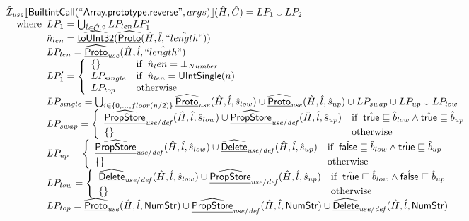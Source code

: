 \[\begin{array}{l}
\hat{\mathcal{I}}_{\it use}\llbracket \mbox{\textsf{BuiltintCall}}(``\mbox{\textsf{Array.prototype.reverse}}",args)\rrbracket(\hat{H},\hat{C}) = LP_1 \cup LP_2\\
\quad{\rm where}\begin{array}[t]{l}
  LP_1 = \bigcup_{\hat{l} \in \hat{C}.2} LP_{len} LP_1'\\
  \hat{n}_{len} = \widehat{\underline{\sf toUInt32}}(\widehat{\underline{\sf Proto}}(\hat{H}, \hat{l}, \hat{``length"}))\\    
  LP_{len} = \widehat{\underline{\sf Proto}}_{\it use}(\hat{H}, \hat{l}, \hat{``length"})\\
  LP_1' = \left\{\begin{array}{ll}
      \left\{\begin{array}{l}\end{array}\right\} & {\rm if}\begin{array}[t]{l}\hat{n}_len = \bot_{Number}\end{array}\\
      LP_{single} & {\rm if}\begin{array}[t]{l}\hat{n}_{len} = \mbox{\textsf{UIntSingle}}(n)\end{array}\\
      LP_{top} & {\rm otherwise}
    \end{array}\right.\\
  LP_{single} = \bigcup_{i \in \{0, ..., floor(n/2)\} } 
    \widehat{\underline{\sf Proto}}_{\it use}(\hat{H}, \hat{l}, \hat{s}_{low}) \cup \widehat{\underline{\sf Proto}}_{\it use}(\hat{H}, \hat{l}, \hat{s}_{up}) \cup LP_{swap} \cup LP_{up} \cup LP_{low}\\
  LP_{swap} = \left\{\begin{array}{ll}
      \widehat{\underline{\sf PropStore}}_{\it use/def}(\hat{H}, \hat{l}, \hat{s}_{low}) \cup \widehat{\underline{\sf PropStore}}_{\it use/def}(\hat{H}, \hat{l}, \hat{s}_{up}) 
      & {\rm if}\begin{array}[t]{l}\hat{\mbox{\textsf{true}}} \sqsubseteq \hat{b}_{low} \land \hat{\mbox{\textsf{true}}} \sqsubseteq \hat{b}_{up} \end{array}\\
      \left\{\begin{array}{l}\end{array}\right\} & {\rm otherwise}
    \end{array}\right.\\
   LP_{up} = \left\{\begin{array}{ll}
      \widehat{\underline{\sf PropStore}}_{\it use/def}(\hat{H}, \hat{l}, \hat{s}_{low}) \cup \widehat{\underline{\sf Delete}}_{\it use/def}(\hat{H}, \hat{l}, \hat{s}_{up}) 
      & {\rm if}\begin{array}[t]{l}\hat{\mbox{\textsf{false}}} \sqsubseteq \hat{b}_{low} \land \hat{\mbox{\textsf{true}}} \sqsubseteq \hat{b}_{up} \end{array}\\
      \left\{\begin{array}{l}\end{array}\right\} & {\rm otherwise}
    \end{array}\right.\\
  LP_{low} = \left\{\begin{array}{ll}
      \widehat{\underline{\sf Delete}}_{\it use/def}(\hat{H}, \hat{l}, \hat{s}_{low}) \cup \widehat{\underline{\sf PropStore}}_{\it use/def}(\hat{H}, \hat{l}, \hat{s}_{up}) 
      & {\rm if}\begin{array}[t]{l}\hat{\mbox{\textsf{true}}} \sqsubseteq \hat{b}_{low} \land \hat{\mbox{\textsf{false}}} \sqsubseteq \hat{b}_{up} \end{array}\\
      \left\{\begin{array}{l}\end{array}\right\} & {\rm otherwise}
    \end{array}\right.\\
  LP_{top} = \widehat{\underline{\sf Proto}}_{\it use}(\hat{H}, \hat{l}, \mbox{\textsf{NumStr}}) \cup \widehat{\underline{\sf PropStore}}_{\it use/def}(\hat{H}, \hat{l}, \mbox{\textsf{NumStr}}) \cup \widehat{\underline{\sf Delete}}_{\it use/def}(\hat{H}, \hat{l}, \mbox{\textsf{NumStr}})\\
\end{array}
\end{array}\]
